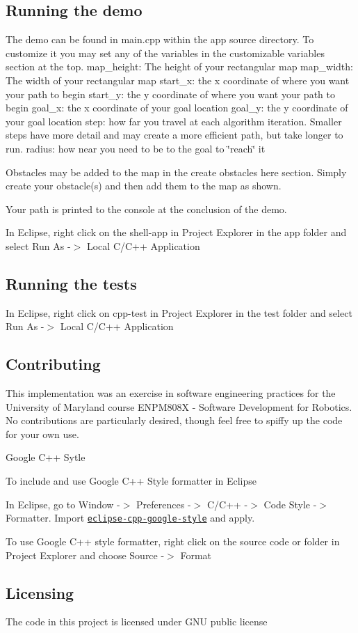 \subsection*{Running the demo}

The demo can be found in main.\+cpp within the app source directory. To customize it you may set any of the variables in the customizable variables section at the top. map\+\_\+height\+: The height of your rectangular map map\+\_\+width\+: The width of your rectangular map start\+\_\+x\+: the x coordinate of where you want your path to begin start\+\_\+y\+: the y coordinate of where you want your path to begin goal\+\_\+x\+: the x coordinate of your goal location goal\+\_\+y\+: the y coordinate of your goal location step\+: how far you travel at each algorithm iteration. Smaller steps have more detail and may create a more efficient path, but take longer to run. radius\+: how near you need to be to the goal to \char`\"{}reach\char`\"{} it

Obstacles may be added to the map in the create obstacles here section. Simply create your obstacle(s) and then add them to the map as shown.

Your path is printed to the console at the conclusion of the demo.

In Eclipse, right click on the shell-\/app in Project Explorer in the app folder and select Run As -\/$>$ Local C/\+C++ Application

\subsection*{Running the tests}

In Eclipse, right click on cpp-\/test in Project Explorer in the test folder and select Run As -\/$>$ Local C/\+C++ Application

\subsection*{Contributing}

This implementation was an exercise in software engineering practices for the University of Maryland course E\+N\+P\+M808X -\/ Software Development for Robotics. No contributions are particularly desired, though feel free to spiffy up the code for your own use.


\begin{DoxyItemize}
\item Google C++ Sytle

To include and use Google C++ Style formatter in Eclipse
\begin{DoxyEnumerate}
\item In Eclipse, go to Window -\/$>$ Preferences -\/$>$ C/\+C++ -\/$>$ Code Style -\/$>$ Formatter. Import \href{https://raw.githubusercontent.com/google/styleguide/gh-pages/eclipse-cpp-google-style.xml}{\tt eclipse-\/cpp-\/google-\/style} and apply.
\item To use Google C++ style formatter, right click on the source code or folder in Project Explorer and choose Source -\/$>$ Format
\end{DoxyEnumerate}
\end{DoxyItemize}

\subsection*{Licensing}

The code in this project is licensed under G\+NU public license 